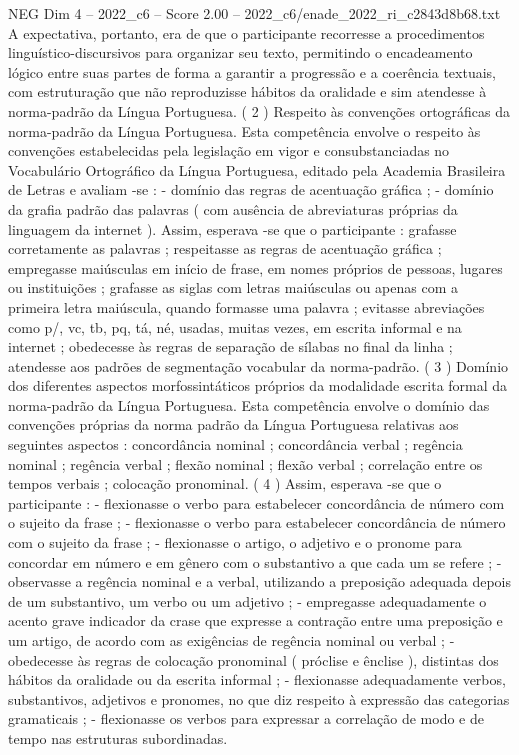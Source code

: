 \begin{textsample}{NEG Dim 4 – 2022\_c6 – Score 2.00 – 2022\_c6/enade\_2022\_ri\_c2843d8b68.txt}
A expectativa, portanto, era de que o participante recorresse a procedimentos linguístico-discursivos para organizar seu texto, permitindo o encadeamento lógico entre suas partes de forma a garantir a progressão e a coerência textuais, com estruturação que não reproduzisse hábitos da oralidade e sim atendesse à norma-padrão da Língua Portuguesa. ( 2 ) Respeito às convenções ortográficas da norma-padrão da Língua Portuguesa.
Esta competência envolve o respeito às convenções estabelecidas pela legislação em vigor e consubstanciadas no Vocabulário Ortográfico da Língua Portuguesa, editado pela Academia Brasileira de Letras e avaliam -se : - domínio das regras de acentuação gráfica ; - domínio da grafia padrão das palavras ( com ausência de abreviaturas próprias da linguagem da internet ).
Assim, esperava -se que o participante : grafasse corretamente as palavras ; respeitasse as regras de acentuação gráfica ; empregasse maiúsculas em início de frase, em nomes próprios de pessoas, lugares ou instituições ; grafasse as siglas com letras maiúsculas ou apenas com a primeira letra maiúscula, quando formasse uma palavra ; evitasse abreviações como p/, vc, tb, pq, tá, né, usadas, muitas vezes, em escrita informal e na internet ; obedecesse às regras de separação de sílabas no final da linha ; atendesse aos padrões de segmentação vocabular da norma-padrão. ( 3 ) Domínio dos diferentes aspectos morfossintáticos próprios da modalidade escrita formal da norma-padrão da Língua Portuguesa.
Esta competência envolve o domínio das convenções próprias da norma padrão da Língua Portuguesa relativas aos seguintes aspectos : concordância nominal ; concordância verbal ; regência nominal ; regência verbal ; flexão nominal ; flexão verbal ; correlação entre os tempos verbais ; colocação pronominal. ( 4 ) Assim, esperava -se que o participante : - flexionasse o verbo para estabelecer concordância de número com o sujeito da frase ; - flexionasse o verbo para estabelecer concordância de número com o sujeito da frase ; - flexionasse o artigo, o adjetivo e o pronome para concordar em número e em gênero com o substantivo a que cada um se refere ; - observasse a regência nominal e a verbal, utilizando a preposição adequada depois de um substantivo, um verbo ou um adjetivo ; - empregasse adequadamente o acento grave indicador da crase que expresse a contração entre uma preposição e um artigo, de acordo com as exigências de regência nominal ou verbal ; - obedecesse às regras de colocação pronominal ( próclise e ênclise ), distintas dos hábitos da oralidade ou da escrita informal ; - flexionasse adequadamente verbos, substantivos, adjetivos e pronomes, no que diz respeito à expressão das categorias gramaticais ; - flexionasse os verbos para expressar a correlação de modo e de tempo nas estruturas subordinadas.

\end{textsample}
